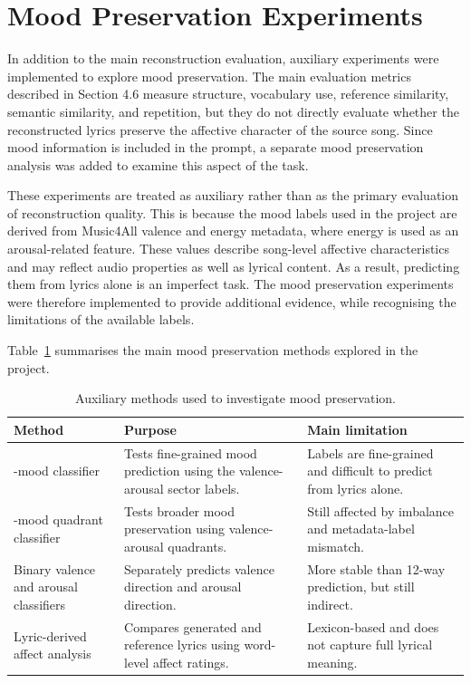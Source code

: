 \section{Mood Preservation Experiments}

In addition to the main reconstruction evaluation, auxiliary experiments were implemented to explore mood preservation. The main evaluation metrics described in Section 4.6 measure structure, vocabulary use, reference similarity, semantic similarity, and repetition, but they do not directly evaluate whether the reconstructed lyrics preserve the affective character of the source song. Since mood information is included in the prompt, a separate mood preservation analysis was added to examine this aspect of the task.

These experiments are treated as auxiliary rather than as the primary evaluation of reconstruction quality. This is because the mood labels used in the project are derived from Music4All valence and energy metadata, where energy is used as an arousal-related feature. These values describe song-level affective characteristics and may reflect audio properties as well as lyrical content. As a result, predicting them from lyrics alone is an imperfect task. The mood preservation experiments were therefore implemented to provide additional evidence, while recognising the limitations of the available labels.

Table~\ref{tab:mood_preservation_methods} summarises the main mood preservation methods explored in the project.

\begin{table}[H]
\centering
\renewcommand{\arraystretch}{1.2}
\caption{Auxiliary methods used to investigate mood preservation.}
\label{tab:mood_preservation_methods}
\begin{tabular}{
>{\raggedright\arraybackslash}p{}
>{\raggedright\arraybackslash}p{}
>{\raggedright\arraybackslash}p{}
}
\hline
Method & Purpose & Main limitation \\
\hline
12-mood classifier & Tests fine-grained mood prediction using the valence-arousal sector labels. & Labels are fine-grained and difficult to predict from lyrics alone. \\
4-mood quadrant classifier & Tests broader mood preservation using valence-arousal quadrants. & Still affected by imbalance and metadata-label mismatch. \\
Binary valence and arousal classifiers & Separately predicts valence direction and arousal direction. & More stable than 12-way prediction, but still indirect. \\
Lyric-derived affect analysis & Compares generated and reference lyrics using word-level affect ratings. & Lexicon-based and does not capture full lyrical meaning. \\
\hline
\end{tabular}
\renewcommand{\arraystretch}{1.0}
\end{table}

